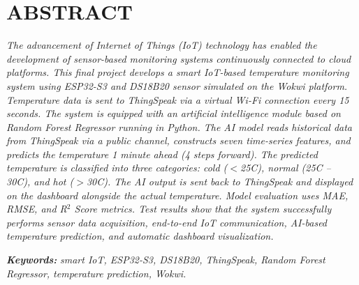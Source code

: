 \clearpage
\chapter*{ABSTRACT}
{}

\textit{The advancement of Internet of Things (IoT) technology has enabled the
development of sensor-based monitoring systems continuously connected to
cloud platforms. This final project develops a smart IoT-based temperature
monitoring system using ESP32-S3 and DS18B20 sensor simulated on the Wokwi
platform. Temperature data is sent to ThingSpeak via a virtual Wi-Fi
connection every 15 seconds. The system is equipped with an artificial
intelligence module based on Random Forest Regressor running in Python. The
AI model reads historical data from ThingSpeak via a public channel,
constructs seven time-series features, and predicts the temperature 1 minute
ahead (4 steps forward).
The predicted temperature is classified into three categories: cold
($<$25\textdegree C), normal (25\textdegree C -- 30\textdegree C), and hot
($>$30\textdegree C). The AI output is sent back to ThingSpeak and displayed
on the dashboard alongside the actual temperature. Model evaluation uses MAE,
RMSE, and R$^2$ Score metrics. Test results show that the system successfully
performs sensor data acquisition, end-to-end IoT communication, AI-based
temperature prediction, and automatic dashboard visualization.}

\vspace{0.7cm}
\noindent\textbf{\textit{Keywords:}} \textit{smart IoT, ESP32-S3, DS18B20,
ThingSpeak, Random Forest Regressor, temperature prediction, Wokwi.}
